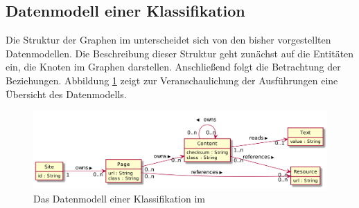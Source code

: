 \subsection{Datenmodell einer Klassifikation}
    \label{section:solutionDetailsPersistenceDataModel}
    Die Struktur der Graphen im {\classificationStorage} unterscheidet
    sich von den bisher vorgestellten Datenmodellen.
    Die Beschreibung dieser Struktur geht zunächst auf die Entitäten ein,
    die Knoten im Graphen darstellen.
    Anschließend folgt die Betrachtung der Beziehungen.
    Abbildung \ref{image:dbDataModelOverview} zeigt zur Veranschaulichung
    der Ausführungen eine Übersicht des Datenmodells.

    \begin{figure}[hbt]
        \centering
        \includegraphics[scale=\imageScalingFactor]{../resources/db-data-model/nodes.png}
        \caption{Das Datenmodell einer Klassifikation im {\classificationStorage}}
        \label{image:dbDataModelOverview}
    \end{figure}


